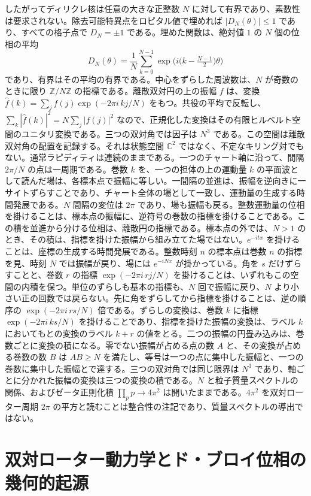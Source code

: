 \documentclass[a4paper]{article}
\begin{document}
したがってディリクレ核は任意の大きな正整数 $N$ に対して有界であり、素数性は要求されない。除去可能特異点をロピタル値で埋めれば $|D_N(\theta)|\le 1$ であり、すべての格子点で $D_N=\pm 1$ である。埋めた関数は、絶対値 $1$ の $N$ 個の位相の平均
\[
D_N(\theta)=\frac1N\sum_{k=0}^{N-1}\exp\bigl(i\bigl(k-\tfrac{N-1}{2}\bigr)\theta\bigr)
\]
であり、有界はその平均の有界である。中心をずらした周波数は、$N$ が奇数のときに限り $\mathbb{Z}/N\mathbb{Z}$ の指標である。離散双対円の上の振幅 $f$ は、変換 $\hat f(k)=\sum_j f(j)\exp(-2\pi i\,kj/N)$ をもつ。共役の平均で反転し、$\sum_k|\hat f(k)|^2=N\sum_j|f(j)|^2$ なので、正規化した変換はその有限ヒルベルト空間のユニタリ変換である。三つの双対角では因子は $N^3$ である。この空間は離散双対角の配置を記録する。それは状態空間 $\mathbb{C}^2$ ではなく、不定なキリング対でもない。通常ラピディティは連続のままである。一つのチャート軸に沿って、間隔 \(2\pi/N\) の点は一周期である。巻数 \(k\) を、一つの担体の上の運動量 \(k\) の平面波として読んだ場は、各標本点で振幅に等しい。一間隔の並進は、振幅を逆向きに一サイトずらすことであり、チャート全体の場として一致し、運動量の生成する時間発展である。\(N\) 間隔の変位は \(2\pi\) であり、場も振幅も戻る。整数運動量の位相を掛けることは、標本点の振幅に、逆符号の巻数の指標を掛けることである。この積を並進から分ける位相は、離散円の指標である。標本点の外では、\(N>1\) のとき、その積は、指標を掛けた振幅から組み立てた場ではない。\(e^{-itx}\) を掛けることは、座標の生成する時間発展である。整数時刻 \(n\) の標本点は巻数 \(n\) の指標を見、時刻 \(N\) では振幅が戻り、場には \(e^{-iNx}\) が掛かっている。角を \(s\) だけずらすことと、巻数 \(r\) の指標 \(\exp(-2\pi i\, rj/N)\) を掛けることは、いずれもこの空間の内積を保つ。単位のずらしも基本の指標も、\(N\) 回で振幅に戻り、\(N\) より小さい正の回数では戻らない。先に角をずらしてから指標を掛けることは、逆の順序の \(\exp(-2\pi i\, rs/N)\) 倍である。ずらしの変換は、巻数 \(k\) に指標 \(\exp(-2\pi i\, ks/N)\) を掛けることであり、指標を掛けた振幅の変換は、ラベル \(k\) においてもとの変換のラベル \(k+r\) の値をとる。二つの振幅の円畳み込みは、巻数ごとに変換の積になる。零でない振幅が占める点の数 \(A\) と、その変換が占める巻数の数 \(B\) は \(AB\ge N\) を満たし、等号は一つの点に集中した振幅と、一つの巻数に集中した振幅とで達する。三つの双対角では同じ限界は \(N^3\) であり、軸ごとに分かれた振幅の変換は三つの変換の積である。$N$ と粒子質量スペクトルの関係、およびゼータ正則化積 $\prod_p p\to 4\pi^2$ は開いたままである。$4\pi^2$ を双対ローター周期 $2\pi$ の平方と読むことは整合性の注記であり、質量スペクトルの導出ではない。

\section{双対ローター動力学とド・ブロイ位相の幾何的起源}
\label{sec:dualrotordynamics}
\end{document}
